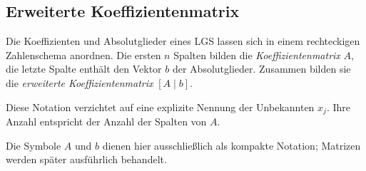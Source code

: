 \subsection{Erweiterte Koeffizientenmatrix}
\label{subsec:linear_systems_augmented_matrix}

Die Koeffizienten und Absolutglieder eines LGS lassen sich in einem rechteckigen
Zahlenschema anordnen. Die ersten $n$ Spalten bilden die
\emph{Koeffizientenmatrix}  $A$, die letzte
Spalte enthält den Vektor $b$ der Absolutglieder. Zusammen bilden sie die
\emph{erweiterte Koeffizientenmatrix} 
$[A\mid b]$.

\begin{center}
\end{center}

Diese Notation verzichtet auf eine explizite Nennung der Unbekannten $x_j$.
Ihre Anzahl entspricht der Anzahl der Spalten von $A$.

Die Symbole $A$ und $b$ dienen hier ausschließlich als kompakte Notation;
Matrizen werden später ausführlich behandelt.

